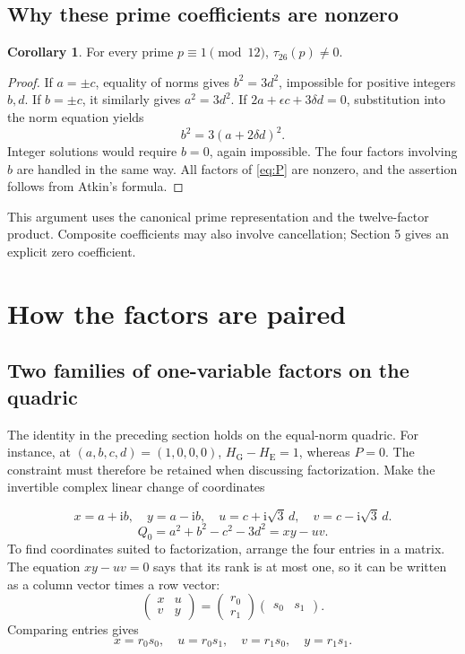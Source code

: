 \documentclass[a4paper,11pt]{article}
\theoremstyle{definition}
\newtheorem{corollary}[proposition]{Corollary}
\newcommand{\iu}{\mathrm i}
\begin{document}
\subsection{Why these prime coefficients are nonzero}
\begin{corollary}\label{cor:prime}
For every prime \(p\equiv1\pmod{12}\), \(\tau_{26}(p)\ne0\).
\end{corollary}
\begin{proof}
If \(a=\pm c\), equality of norms gives \(b^2=3d^2\), impossible for
positive integers \(b,d\). If \(b=\pm c\), it similarly gives
\(a^2=3d^2\).
If \(2a+\epsilon c+3\delta d=0\), substitution into the norm equation
yields
\[
 b^2=3(a+2\delta d)^2.
\]
Integer solutions would require \(b=0\), again impossible.
The four factors involving \(b\) are handled in the same way.
All factors of \eqref{eq:P} are nonzero, and the assertion follows
from Atkin's formula.
\end{proof}
This argument uses the canonical prime representation and the twelve-factor product.
Composite coefficients may also involve cancellation; Section 5 gives an explicit zero coefficient.


\section{How the factors are paired}
\subsection{Two families of one-variable factors on the quadric}
The identity in the preceding section holds on the equal-norm quadric.
For instance, at \((a,b,c,d)=(1,0,0,0)\),
\(H_{\mathrm G}-H_{\mathrm E}=1\), whereas \(P=0\).
The constraint must therefore be retained when discussing factorization.
Make the invertible complex linear change of coordinates

\begin{equation}\label{eq:complexcoords}
 x=a+\iu b,\quad y=a-\iu b,\quad
 u=c+\iu\sqrt3\,d,\quad v=c-\iu\sqrt3\,d.
\end{equation}
\begin{equation}\label{eq:quadric}
 Q_0=a^2+b^2-c^2-3d^2=xy-uv.
\end{equation}
To find coordinates suited to factorization, arrange the four entries in a matrix.
The equation \(xy-uv=0\) says that its rank is at most one,
so it can be written as a column vector times a row vector:
\[
 \begin{pmatrix}x&u\\v&y\end{pmatrix}
 =\begin{pmatrix}r_0\\r_1\end{pmatrix}
  \begin{pmatrix}s_0&s_1\end{pmatrix}.
\]
Comparing entries gives
\begin{equation}\label{eq:Segre}
 x=r_0s_0,\quad u=r_0s_1,\quad
 v=r_1s_0,\quad y=r_1s_1.
\end{equation}
\end{document}
